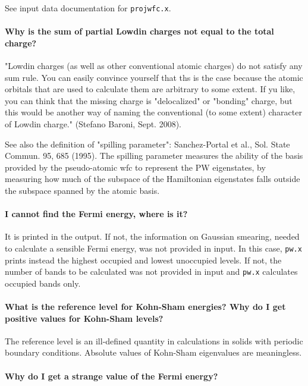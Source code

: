 \documentclass[12pt,a4paper]{article}
\def\pw.x{\texttt{pw.x}}
\begin{document}
See input data documentation for \texttt{projwfc.x}.

\paragraph{Why is the sum of partial Lowdin charges not equal to
  the total charge?} 

"Lowdin charges (as well as other conventional atomic charges) do not
satisfy any sum rule. You can easily convince yourself that ths is the
case because the atomic orbitals that are used to calculate them are
arbitrary to some extent. If yu like, you can think that the missing
charge is "delocalized" or "bonding" charge, but this would be another
way of naming the conventional (to some extent) character of Lowdin
charge." (Stefano Baroni, Sept. 2008).  

See also the definition of "spilling parameter": Sanchez-Portal et
al., Sol. State Commun. 95, 685 (1995). The spilling parameter
measures the ability of the basis provided by the pseudo-atomic wfc to
represent the PW eigenstates, by measuring how much of the subspace of
the Hamiltonian eigenstates falls outside the subspace spanned by the
atomic basis. 

\paragraph{I cannot find the Fermi energy, where is it?}  

It is printed in the output. If not, the information on Gaussian smearing,
needed to calculate a sensible Fermi energy, was not provided in input.
In this case, \pw.x prints instead the highest occupied and lowest
unoccupied levels. If not, the number of bands to be calculated was not 
provided in input and \pw.x calculates occupied bands only.

\paragraph{What is the reference level for Kohn-Sham energies? 
Why do I get positive values for Kohn-Sham levels?}

The reference level is an ill-defined quantity in calculations
in solids with periodic boundary conditions. Absolute values of
Kohn-Sham eigenvalues are meaningless. 

\paragraph{Why do I get a strange value of the Fermi energy?}
\end{document}
